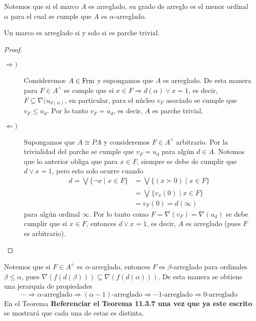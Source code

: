 Notemos que si el marco $A$ es arreglado, su grado de arreglo es el menor ordinal $\alpha$ para el cual se cumple que $A$ es $\alpha$-arreglado.

\begin{lem}\label{Lema8.2.2}
    Un marco es arreglado si y solo si es parche trivial.
\end{lem}

\begin{proof}
    \begin{description}
        \item[$\Rightarrow )$] Consideremos $A\in \mathrm{Frm}$ y supongamos que $A$ es arreglado. De esta manera para $F\in A^\wedge$ se cumple que si $x\in F\Rightarrow d(\alpha)\vee x=1$, es decir, $F\subseteq \nabla(u_{d(\alpha)}$, en particular, para el núcleo $v_F$ asociado se cumple que $v_F\leq u_d$. Por lo tanto $v_F=u_d$, es decir, $A$ es parche trivial.

        \item[$\Leftarrow )$] Supongamos que $A\cong PA$ y consideremos $F\in A^\wedge$ arbitrario. Por la trivialidad del parche se cumple que $v_F=u_d$ para algún $d\in A$. Notemos que lo anterior obliga que para $x\in F$, siempre se debe de cumplir que $d\vee x=1$, pero esto solo ocurre cuando 
        \[
        \begin{split}
        d=\bigvee \{\neg x\mid x\in F\}&=\bigvee\{(x\succ 0)\mid x\in F\}\\
        &=\dot{\bigvee}\{v_x(0)\mid x\in F\}\\
        &=v_F(0)=d(\infty)
        \end{split}
        \]
        para algún ordinal $\infty$. Por lo tanto como $F=\nabla(v_F)=\nabla(u_d)$ se debe cumplir que si $x\in F$, entonces $d\vee x=1$, es decir, $A$ es arreglado (pues $F$ es arbitrario). 
    \end{description}
\end{proof}

Notemos que si $F\in A^\wedge$ es $\alpha$-arreglado, entonces $F$ es $\beta$-arreglado para ordinales $\beta\leq \alpha$, pues $\nabla(f(d(\beta)))\subseteq \nabla(f(d(\alpha)))$. De esta manera se obtiene una jerarquía de propiedades
\[
\cdots \Rightarrow \alpha\mbox{-arreglado}\Rightarrow (\alpha-1)\mbox{-arreglado}\Rightarrow \cdots 1\mbox{-arreglado}\Rightarrow 0\mbox{-arreglado}
\]
En el Teorema \textbf{Referenciar el Teorema 11.3.7 una vez que ya este escrito} se mostrará que cada una de estas es distinta.\\

